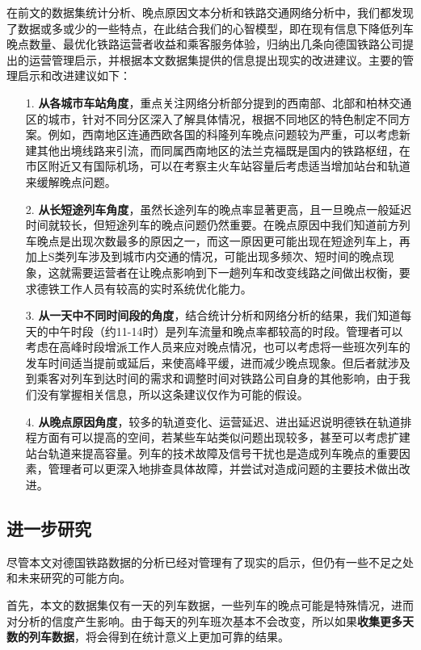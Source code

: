\documentclass[lang=cn,12pt,a4paper,cite=authoryear]{elegantpaper}
\begin{document}
在前文的数据集统计分析、晚点原因文本分析和铁路交通网络分析中，我们都发现了数据或多或少的一些特点，在此结合我们的心智模型，即在现有信息下降低列车晚点数量、最优化铁路运营者收益和乘客服务体验，归纳出几条向德国铁路公司提出的运营管理启示，并根据本文数据集提供的信息提出现实的改进建议。主要的管理启示和改进建议如下：
\begin{itemize}
	\item[1.] \textbf{从各城市车站角度}，重点关注网络分析部分提到的西南部、北部和柏林交通区的城市，针对不同分区深入了解具体情况，根据不同地区的特色制定不同方案。例如，西南地区连通西欧各国的科隆列车晚点问题较为严重，可以考虑新建其他出境线路来引流，而同属西南地区的法兰克福既是国内的铁路枢纽，在市区附近又有国际机场，可以在考察主火车站容量后考虑适当增加站台和轨道来缓解晚点问题。
	\item[2.] \textbf{从长短途列车角度}，虽然长途列车的晚点率显著更高，且一旦晚点一般延迟时间就较长，但短途列车的晚点问题仍然重要。在晚点原因中我们知道前方列车晚点是出现次数最多的原因之一，而这一原因更可能出现在短途列车上，再加上S类列车涉及到城市内交通的情况，可能出现多频次、短时间的晚点现象，这就需要运营者在让晚点影响到下一趟列车和改变线路之间做出权衡，要求德铁工作人员有较高的实时系统优化能力。
	\item[3.] \textbf{从一天中不同时间段的角度}，结合统计分析和网络分析的结果，我们知道每天的中午时段（约11-14时）是列车流量和晚点率都较高的时段。管理者可以考虑在高峰时段增派工作人员来应对晚点情况，也可以考虑将一些班次列车的发车时间适当提前或延后，来使高峰平缓，进而减少晚点现象。但后者就涉及到乘客对列车到达时间的需求和调整时间对铁路公司自身的其他影响，由于我们没有掌握相关信息，所以这条建议仅作为可能的假设。
	\item[4.] \textbf{从晚点原因角度}，较多的轨道变化、运营延迟、进出延迟说明德铁在轨道排程方面有可以提高的空间，若某些车站类似问题出现较多，甚至可以考虑扩建站台轨道来提高容量。列车的技术故障及信号干扰也是造成列车晚点的重要因素，管理者可以更深入地排查具体故障，并尝试对造成问题的主要技术做出改进。
\end{itemize}

\subsection{进一步研究}

尽管本文对德国铁路数据的分析已经对管理有了现实的启示，但仍有一些不足之处和未来研究的可能方向。

首先，本文的数据集仅有一天的列车数据，一些列车的晚点可能是特殊情况，进而对分析的信度产生影响。由于每天的列车班次基本不会改变，所以如果\textbf{收集更多天数的列车数据}，将会得到在统计意义上更加可靠的结果。
\end{document}
